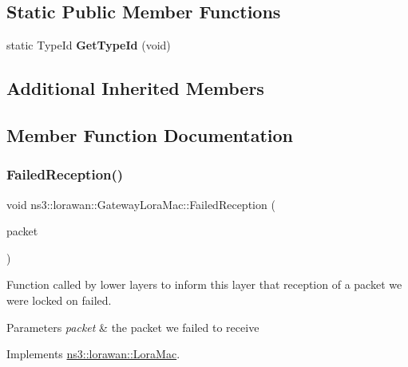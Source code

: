 \subsection*{Static Public Member Functions}
\begin{DoxyCompactItemize}
\item 
\mbox{\label{classns3_1_1lorawan_1_1GatewayLoraMac_a99dcd0d95d3ea8196aa0402d46d98896}} 
static Type\+Id {\bfseries Get\+Type\+Id} (void)
\end{DoxyCompactItemize}
\subsection*{Additional Inherited Members}


\subsection{Member Function Documentation}
\mbox{\label{classns3_1_1lorawan_1_1GatewayLoraMac_a2d752f0ff766d409e1eb91d7bcd06ad5}} 
\subsubsection{\texorpdfstring{Failed\+Reception()}{FailedReception()}}
{\footnotesize\ttfamily void ns3\+::lorawan\+::\+Gateway\+Lora\+Mac\+::\+Failed\+Reception (\begin{DoxyParamCaption}\item[{Ptr$<$ Packet const $>$}]{packet }\end{DoxyParamCaption})\hspace{0.3cm}{\ttfamily [virtual]}}

Function called by lower layers to inform this layer that reception of a packet we were locked on failed.


\begin{DoxyParams}{Parameters}
{\em packet} & the packet we failed to receive \\
\hline
\end{DoxyParams}


Implements \hyperlink{classns3_1_1lorawan_1_1LoraMac_afcd55472bbfa299c4d0239d5fa9957e3}{ns3\+::lorawan\+::\+Lora\+Mac}.

